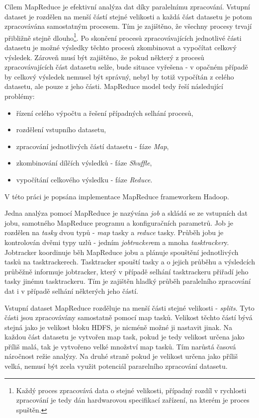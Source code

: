 \documentclass[11pt,twoside,a4paper]{book}
\begin{document}
			Cílem MapReduce je efektivní analýza dat díky paralelnímu zpracování. Vstupní dataset je rozdělen na menší částí stejné velikosti a každá část datasetu je potom zpracovávána samostatným procesem. Tím je zajištěno, že všechny procesy trvají přibližně stejně dlouho\footnote{Každý proces zpracovává data o stejné velikosti, případný rozdíl v rychlosti zpracování je tedy dán hardwarovou specifikací zařízení, na kterém je proces spuštěn.}. Po skončení procesů zpracovávajících jednotlivé části datasetu je možné výsledky těchto procesů zkombinovat a vypočítat celkový výsledek. Zároveň musí být zajištěno, že pokud některý z procesů zpracovávajících část datasetu selže, bude situace vyřešena - v opačném případě by celkový výsledek nemusel být správný, nebyl by totiž vypočítán z celého datasetu, ale pouze z jeho části. MapReduce model tedy řeší následující problémy: 
\begin{itemize}
	\item{řízení celého výpočtu a řešení případných selhání procesů,}
	\item{rozdělení vstupního datasetu,}
	\item{zpracování jednotlivých částí datasetu - fáze \textit{Map},}
	\item{zkombinování dílčích výsledků - fáze \textit{Shuffle},}
	\item{vypočítání celkového výsledku - fáze \textit{Reduce}.}
\end{itemize}
	
			V této práci je popsána implementace MapReduce frameworkem Hadoop. 

			Jedna analýza pomocí MapReduce je nazývána \textit{job} a skládá se ze vstupních dat jobu, samotného MapReduce programu a konfiguračních parametrů. Job je rozdělen na \textit{tasky} dvou typů - \textit{map} tasky a \textit{reduce} tasky. Průběh jobu je kontrolován dvěmi typy uzlů - jedním \textit{jobtracker}em a mnoha \textit{tasktracker}y. Jobtracker koordinuje běh MapReduce jobu a plánuje spouštění jednotlivých tasků na tasktrackerech. Tasktracker spouští tasky a o jejich průběhu a výsledcích průběžně informuje jobtracker, který v případě selhání tasktrackeru přiřadí jeho tasky jinému tasktrackeru. Tím je zajištěn hladký průběh paralelního zpracování dat i v případě selhání některých jeho částí.\cite{mapredb02}

			Vstupní dataset MapReduce rozděluje na menší části stejné velikosti - \textit{splits}. Tyto části jsou zpracovávány samostatně pomocí map tasků. Velikost těchto částí bývá stejná jako je velikost bloku HDFS, je nicméně možné ji nastavit jinak. Na každou část datasetu je vytvořen map task, pokud je tedy velikost určena jako příliš malá, tak je vytvořeno velké množství map tasků. Tím narůstá časová náročnost režie analýzy. Na druhé straně pokud je velikost určena jako příliš velká, nemusí být zcela využit potenciál pararelního zpracování datasetu. 
\end{document}
